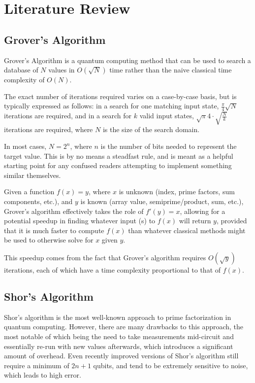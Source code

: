 \documentclass[twocolumn]{cinc}
\begin{document}
\section{Literature Review}

  \subsection{Grover's Algorithm}

  Grover's Algorithm is a quantum computing method 
  that can be used to search a database of $N$ values in $O(\sqrt{N})$ time 
  rather than the naive classical time complexity of $O(N)$\cite{grover}. 

  The exact number of iterations required varies on a case-by-case basis,
  but is typically expressed as follows: in a search for one matching input
  state, $\frac{\pi}{4}\sqrt{N}$ iterations are required, and in a search
  for $k$ valid input states, $\sqrt{\pi}{4}\cdot \sqrt{\frac{N}{k}}$
  iterations are required, where $N$ is the size of the search domain.

  In most cases, $N=2^n$, where $n$ is the number of bits needed to represent
  the target value. This is by no means a steadfast rule, and is meant as 
  a helpful starting point for any confused readers attempting to implement
  something similar themselves.
  
  Given a function $f(x)=y$, where $x$ is unknown (index, prime factors, 
  sum components, etc.), and $y$ is known (array value, semiprime/product, 
  sum, etc.), Grover's algorithm effectively takes the role of $f'(y)=x$, 
  allowing for a potential speedup in finding whatever input (s) to $f(x)$
  will return $y$, provided that it is much faster to compute $f(x)$ than
  whatever classical methods might be used to otherwise solve for $x$ given $y$.

  This speedup comes from the fact that Grover's algorithm requires 
  $O(\sqrt{y})$ iterations, each of which have a time complexity proportional
  to that of $f(x)$.

  \subsection{Shor's Algorithm}

  Shor's algorithm is the most well-known approach to prime factorization
  in quantum computing. However, there are many drawbacks to this approach,
  the most notable of which being the need to take measurements mid-circuit
  and essentially re-run with new values afterwards, which introduces a 
  significant amount of overhead. Even recently improved versions of Shor's
  algorithm still require a minimum of $2n+1$ qubits, and tend to be 
  extremely sensitive to noise, which leads to high error\cite{quantum_factoring,shor}.
\end{document}
